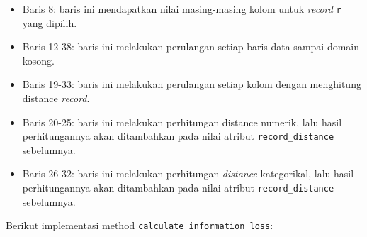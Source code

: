 \vspace{0.2cm}
\begin{itemize}
\item Baris 8: baris ini mendapatkan nilai masing-masing kolom untuk \textit{record} \texttt{r} yang dipilih.
\item Baris 12-38: baris ini melakukan perulangan setiap baris data sampai domain kosong.
\item Baris 19-33: baris ini melakukan perulangan setiap kolom dengan menghitung distance \textit{record}.
\item Baris 20-25: baris ini melakukan perhitungan distance numerik, lalu hasil perhitungannya akan ditambahkan pada nilai atribut \texttt{record\_distance} sebelumnya.
\item Baris 26-32: baris ini melakukan perhitungan \textit{distance} kategorikal, lalu hasil perhitungannya akan ditambahkan pada nilai atribut \texttt{record\_distance} sebelumnya.
\end{itemize}

\noindent Berikut implementasi method \texttt{calculate\_information\_loss}:

